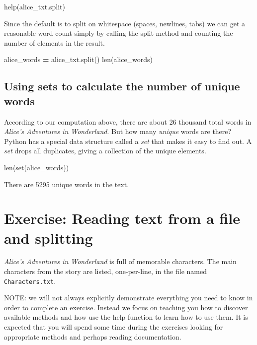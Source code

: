 \documentclass[]{book}
\newenvironment{Shaded}{\begin{snugshade}}{\end{snugshade}}
\newcommand{\OperatorTok}[1]{\textcolor[rgb]{0.81,0.36,0.00}{\textbf{#1}}}
\newcommand{\BuiltInTok}[1]{#1}
\newcommand{\NormalTok}[1]{#1}
\begin{document}
\begin{Shaded}
\begin{Highlighting}[]
\BuiltInTok{help}\NormalTok{(alice_txt.split)}
\end{Highlighting}
\end{Shaded}

Since the default is to split on whitespace (spaces, newlines, tabs) we
can get a reasonable word count simply by calling the split method and
counting the number of elements in the result.

\begin{Shaded}
\begin{Highlighting}[]
\NormalTok{alice_words }\OperatorTok{=}\NormalTok{ alice_txt.split()}
\BuiltInTok{len}\NormalTok{(alice_words)}
\end{Highlighting}
\end{Shaded}

\subsection{Using sets to calculate the number of unique
words}\label{using-sets-to-calculate-the-number-of-unique-words}

According to our computation above, there are about 26 thousand total
words in \emph{Alice's Adventures in Wonderland}. But how many
\emph{unique} words are there? Python has a special data structure
called a \emph{set} that makes it easy to find out. A \emph{set} drops
all duplicates, giving a collection of the unique elements.

\begin{Shaded}
\begin{Highlighting}[]
\BuiltInTok{len}\NormalTok{(}\BuiltInTok{set}\NormalTok{(alice_words))}
\end{Highlighting}
\end{Shaded}

There are 5295 unique words in the text.

\section{Exercise: Reading text from a file and
splitting}\label{exercise-reading-text-from-a-file-and-splitting}

\emph{Alice's Adventures in Wonderland} is full of memorable characters.
The main characters from the story are listed, one-per-line, in the file
named \texttt{Characters.txt}.

NOTE: we will not always explicitly demonstrate everything you need to
know in order to complete an exercise. Instead we focus on teaching you
how to discover available methods and how use the help function to learn
how to use them. It is expected that you will spend some time during the
exercises looking for appropriate methods and perhaps reading
documentation.
\end{document}
